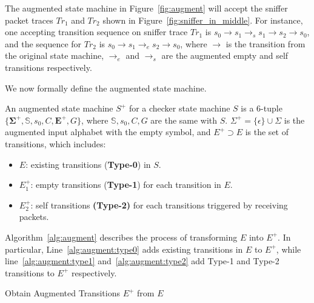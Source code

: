 The augmented state machine in Figure~\ref{fig:augment} will accept the sniffer
packet traces $Tr_1$ and $Tr_2$ shown in Figure~\ref{fig:sniffer_in_middle}.
%
For instance, one accepting transition sequence on sniffer trace $Tr_1$ is
$s_0\rightarrow s_1 \rightarrow_s s_1\rightarrow s_2 \rightarrow s_0$, and the
sequence for $Tr_2$ is $s_0 \rightarrow s_1 \rightarrow_e s_2 \rightarrow s_0$,
where $\rightarrow$ is the transition from the original state machine,
$\rightarrow_e$ and $\rightarrow_s$ are the augmented empty and self transitions
respectively.

We now formally define the augmented state machine.

\begin{definition}
  An augmented state machine $S^+$ for a checker state machine $S$ is a 6-tuple
  $\{\boldsymbol{\Sigma^+}, \mathbb{S}, s_0, C, \boldsymbol{E^+}, G\}$, where $\mathbb{S},
  s_0, C, G$ are the same with $S$. $\Sigma^+=\{\epsilon\} \cup \Sigma$ is
  the augmented input alphabet with the empty symbol, and $E^+ \supset E$ is the
  set of transitions, which includes:
  \begin{itemize}
    \item $E$: existing transitions (\textbf{Type-0}) in $S$.
    \item $E^+_1$: empty transitions (\textbf{Type-1}) for each transition in $E$.
    \item $E^+_2$: self transitions \textbf{(Type-2)} for each transitions
      triggered by receiving packets.
  \end{itemize}
\end{definition}

Algorithm~\ref{alg:augment} describes the process of transforming $E$ into
$E^+$.
%
In particular, Line~\ref{alg:augment:type0} adds existing transitions in $E$ to
$E^+$, while line~\ref{alg:augment:type1} and~\ref{alg:augment:type2} add Type-1
and Type-2 transitions to $E^+$ respectively.

\begin{algorithm}[t!]
  \begin{algorithmic}[1]
      \label{alg:augment:type0}
      \label{alg:augment:type1}
        \label{alg:augment:type2}
      \EndIf
    \EndFor
    \State {}
    \EndFunction
  \end{algorithmic}
  \caption{Obtain Augmented Transitions $E^+$ from $E$}
  \label{alg:augment}
\end{algorithm}

